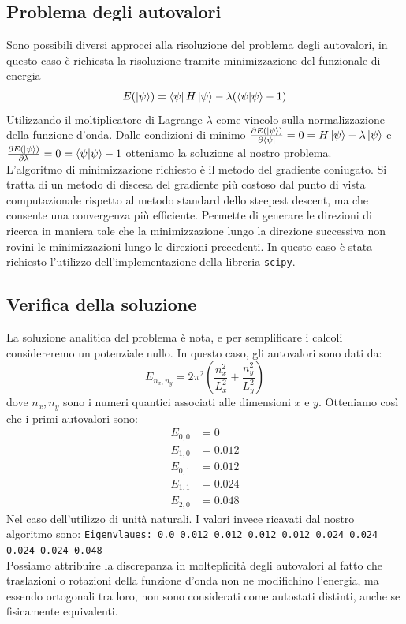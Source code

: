 \documentclass{article}
\begin{document}
\subsection{Problema degli autovalori}
Sono possibili diversi approcci alla risoluzione del problema degli autovalori, in questo caso è richiesta la risoluzione tramite minimizzazione del 
funzionale di energia 
\begin{equation}
    E(\ket{\psi})=\bra{\psi} H \ket{\psi} - \lambda(\langle \psi|\psi \rangle-1)
\end{equation}
Utilizzando il moltiplicatore di Lagrange $\lambda$ come vincolo sulla normalizzazione della funzione d'onda. 
Dalle condizioni di minimo $\frac{\partial E(\ket{\psi})}{\partial \bra{\psi}}=0=H\ket{\psi}-\lambda\ket{\psi}$ e $\frac{\partial E(\ket{\psi})}{\partial \lambda}=0=\langle \psi | \psi \rangle -1$ otteniamo la soluzione al nostro problema.
\\
L'algoritmo di minimizzazione richiesto è il metodo del gradiente coniugato. Si tratta di un metodo di discesa del gradiente più costoso dal punto di vista computazionale rispetto al metodo standard dello steepest descent, ma che consente una convergenza più efficiente.
Permette di generare le direzioni di ricerca in maniera tale che la minimizzazione lungo la direzione successiva non rovini le minimizzazioni lungo le direzioni precedenti.
In questo caso è stata richiesto l'utilizzo dell'implementazione della libreria \texttt{scipy}.
\subsection{Verifica della soluzione}
La soluzione analitica del problema è nota, e per semplificare i calcoli considereremo un potenziale nullo. In questo caso, gli autovalori sono dati da:
\begin{equation}
    E_{n_x,n_y} = 2\pi^2 \left( \frac{n_x^2}{L_x^2} + \frac{n_y^2}{L_y^2} \right)
\end{equation}
dove $n_x, n_y$ sono i numeri quantici associati alle dimensioni $x$ e $y$. Otteniamo così che i primi autovalori sono:
\begin{align*}
    E_{0,0} &= 0 \\ E_{1,0} &= 0.012 \\ E_{0,1} &= 0.012 \\ E_{1,1} &= 0.024 \\
    E_{2,0} &= 0.048
\end{align*}
Nel caso dell'utilizzo di unità naturali. I valori invece ricavati dal nostro algoritmo sono:
\texttt{Eigenvlaues: 0.0 0.012 0.012 0.012 0.012 0.024 0.024 0.024 0.024 0.048} \\ Possiamo attribuire la discrepanza in molteplicità degli autovalori 
al fatto che traslazioni o rotazioni della funzione d'onda non ne modifichino l'energia, ma essendo ortogonali tra loro, non sono considerati come autostati distinti, 
anche se fisicamente equivalenti.
\end{document}
